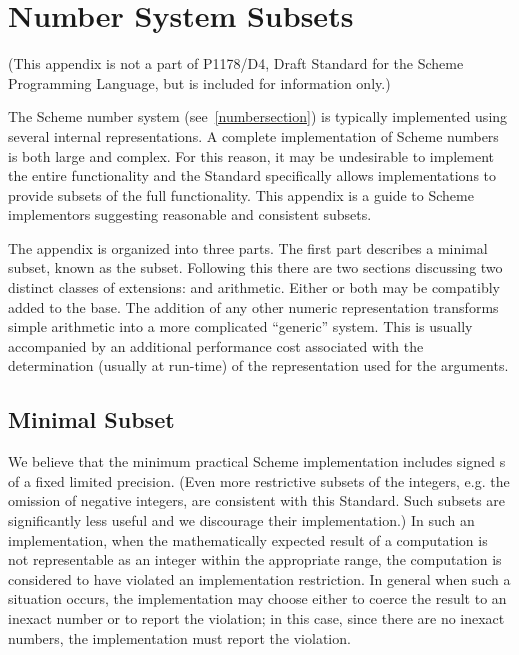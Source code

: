 \chapter{Number System Subsets}

(This appendix is not a part of P1178/D4, Draft Standard for the
Scheme Programming Language, but is included for information only.)

\vest The Scheme number system (see~\ref{numbersection}) is typically
implemented using several internal representations.  A complete
implementation of Scheme numbers is both large and complex.  For this
reason, it may be undesirable to implement the entire functionality
and the Standard specifically allows implementations to provide
subsets of the full functionality.  This appendix is a guide to Scheme
implementors suggesting reasonable and consistent subsets.

\vest The appendix is organized into three parts.  The first part
describes a minimal subset, known as the  subset.
Following this there are two sections discussing two distinct classes
of extensions:  and  arithmetic.  Either or
both may be compatibly added to the  base.  The addition
of any other numeric representation transforms simple 
arithmetic into a more complicated ``generic'' system.  This is
usually accompanied by an additional performance cost associated with
the determination (usually at run-time) of the representation used for
the arguments.

\section{Minimal Subset}

\vest We believe that the minimum practical Scheme implementation
includes signed  s of a fixed limited
precision.  (Even more restrictive subsets of the integers, e.g. the
omission of negative integers, are consistent with this Standard.
Such subsets are significantly less useful and we discourage their
implementation.)  In such an implementation, when the mathematically
expected result of a computation is not representable as an integer
within the appropriate range, the computation is considered to have
violated an implementation restriction.  In general when such a
situation occurs, the implementation may choose either to coerce the
result to an inexact number or to report the violation; in this case,
since there are no inexact numbers, the implementation must report the
violation.

